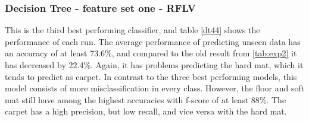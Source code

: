 \documentclass[USenglish]{ifimaster}  %
\begin{document}
\subsubsection{Decision Tree - feature set one - RFLV}
This is the third best performing classifier, and table \ref{dt44} shows the performance of each run. The average performance of predicting unseen data has an accuracy of at least 73.6\%, and compared to the old result from \ref{tab:exp2} it has decreased by 22.4\%. Again, it has problems predicting the hard mat, which it tends to predict as carpet. In contrast to the three best performing models, this model consists of more misclassification in every class. However, the floor and soft mat still have among the highest accuracies with f-score of at least 88\%. The carpet has a high precision, but low recall, and vice versa with the hard mat.
\end{document}
